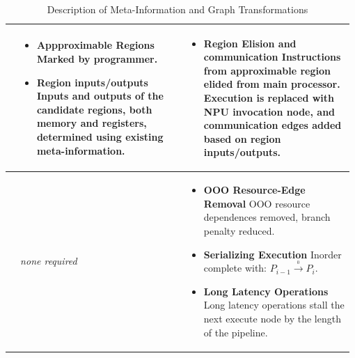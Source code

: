 \begin{table}[h]
\begin{adjustwidth}{-0.6in}{-0.6in}
\begin{center}
\begin{tabular}{m{0.02\linewidth}m{0.48\linewidth}m{0.48\linewidth}}
\\ [-0.6\normalbaselineskip]  \midrule

\parbox[t]{1mm}{} 
&
\begin{itemize} 
  \item \textbf{Appproximable Regions} Marked by programmer.
  \item \textbf{Region inputs/outputs}
    Inputs and outputs of the candidate regions, both memory
    and registers, determined using existing meta-information.
\end{itemize}
&
\begin{itemize}
  \item \textbf{Region Elision and communication}
   Instructions from approximable region elided from main processor. 
   Execution is replaced with NPU invocation node, and communication
   edges added based on region inputs/outputs.
\end{itemize}
\\ [-0.6\normalbaselineskip]  \midrule



\parbox[t]{1mm}{} 
& 
\centering
\emph{none required}
& 
\begin{itemize}
\item \textbf{OOO Resource-Edge Removal} 
OOO resource dependences removed, branch penalty reduced.
\item \textbf{Serializing Execution} 
Inorder complete with: $P_{i-1} \xrightarrow{_0} P_{i}$.
\item \textbf{Long Latency Operations}
Long latency operations stall the next execute node by the length of the pipeline.
\end{itemize}

\\ [-0.6\normalbaselineskip]  \bottomrule 

\end{tabular}

\caption{Description of Meta-Information and Graph Transformations}
\label{tab:megametatrans}  
\end{center}
\vspace{-0.15in}
\end{adjustwidth}

\end{table}


